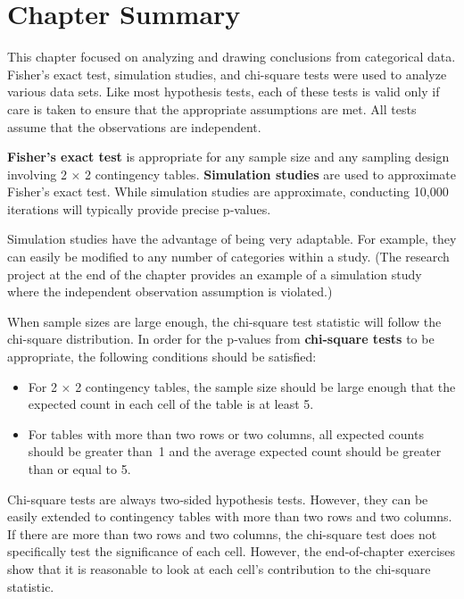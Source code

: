 \documentclass[
]{report}
\providecommand{\tightlist}{%
  \setlength{\itemsep}{0pt}\setlength{\parskip}{0pt}}
\begin{document}
\hypertarget{chapter-summary-4}{%
\section{\texorpdfstring{\textbf{Chapter Summary}}{Chapter Summary}}\label{chapter-summary-4}}

This chapter focused on analyzing and drawing conclusions from categorical data. Fisher's exact test, simulation studies, and chi-square tests were used to analyze various data sets. Like most hypothesis tests, each of these tests is valid only if care is taken to ensure that the appropriate assumptions are met. All tests assume that the observations are independent.

\textbf{Fisher's exact test} is appropriate for any sample size and any sampling design involving 2 × 2 contingency tables. \textbf{Simulation studies} are used to approximate Fisher's exact test. While simulation studies are approximate, conducting 10,000 iterations will typically provide precise p‑values.

Simulation studies have the advantage of being very adaptable. For example, they can easily be modified to any number of categories within a study. (The research project at the end of the chapter provides an example of a simulation study where the independent observation assumption is violated.)

When sample sizes are large enough, the chi-square test statistic will follow the chi-square distribution. In order for the p‑values from \textbf{chi-square tests} to be appropriate, the following conditions should be satisfied:

\begin{itemize}
\tightlist
\item
  For 2 × 2 contingency tables, the sample size should be large enough that the expected count in each cell of the table is at least 5.
\item
  For tables with more than two rows or two columns, all expected counts should be greater than~1 and the average expected count should be greater than or equal to 5.
\end{itemize}

Chi-square tests are always two‑sided hypothesis tests. However, they can be easily extended to contingency tables with more than two rows and two columns. If there are more than two rows and two columns, the chi-square test does not specifically test the significance of each cell. However, the end‑of‑chapter exercises show that it is reasonable to look at each cell's contribution to the chi-square statistic.
\end{document}
